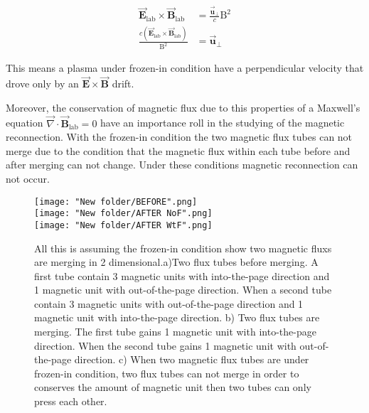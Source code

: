 \documentclass[12pt, a4paper]{article}
\begin{document}
			\begin{align*}
				\vec{\mathbf{E}}_{\text{lab}}\times\vec{\mathbf{B}}_{\text{lab}}&=\frac{\vec{\mathbf{u}}_\perp}{c}\text{B}^2\\
				 \frac{c\left(\vec{\mathbf{E}}_{\text{lab}}\times\vec{\mathbf{B}}_{\text{lab}} \right)}{\text{B}^{2}}&=\vec{\mathbf{u}}_\perp
			\end{align*}
			\par
			This means a plasma under frozen-in condition have a perpendicular velocity that drove only by an $\vec{\mathbf{E}}\times\vec{\mathbf{B}}$ drift.\par
			Moreover, the conservation of magnetic flux due to this properties of a Maxwell's equation
			$\vec{\nabla}\cdot\vec{\mathbf{B}}_{\text{lab}}=0$ have an importance roll in the studying of the magnetic reconnection. With the frozen-in condition the two magnetic flux tubes can not merge due to the condition that the magnetic flux within each tube before and after merging can not change. Under these conditions magnetic reconnection can not occur.
			\begin{figure}[hbtp]
			\centering
			\texttt{[image: "New folder/BEFORE".png]}\\
			\texttt{[image: "New folder/AFTER NoF".png]}\\
			\texttt{[image: "New folder/AFTER WtF".png]}
			\caption{All this is assuming the frozen-in condition show two magnetic fluxs are merging in 2 dimensional.a)Two flux tubes before merging. A first tube contain 3 magnetic units with into-the-page direction and 1 magnetic unit with out-of-the-page direction. When a second tube contain 3 magnetic units with out-of-the-page direction and 1 magnetic unit with into-the-page direction. b) Two flux tubes are merging. The first tube gains 1 magnetic unit with into-the-page direction. When the second tube gains 1 magnetic unit with out-of-the-page direction. c) When two magnetic flux tubes are under frozen-in condition, two flux tubes can not merge in order to conserves the amount of magnetic unit then two tubes can only press each other.}
			\end{figure}
			\newpage
\end{document}
